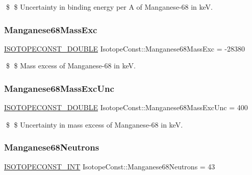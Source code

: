 \$ \$ Uncertainty in binding energy per A of Manganese-\/68 in keV. \mbox{\label{group___isotope_const-_manganese-_mn68_ga90b729dea090cddccef6f1aadea3bc76}} 
\subsubsection{\texorpdfstring{Manganese68\+Mass\+Exc}{Manganese68MassExc}}
{\footnotesize\ttfamily \mbox{\hyperlink{group___isotope_const-_macros_ga8f45a7272ce02c0b4c65c44636ed719a}{I\+S\+O\+T\+O\+P\+E\+C\+O\+N\+S\+T\+\_\+\+D\+O\+U\+B\+LE}} Isotope\+Const\+::\+Manganese68\+Mass\+Exc = -\/28380}

\$ \$ Mass excess of Manganese-\/68 in keV. \mbox{\label{group___isotope_const-_manganese-_mn68_ga2876be132f474e4c2b820f9cf561535a}} 
\subsubsection{\texorpdfstring{Manganese68\+Mass\+Exc\+Unc}{Manganese68MassExcUnc}}
{\footnotesize\ttfamily \mbox{\hyperlink{group___isotope_const-_macros_ga8f45a7272ce02c0b4c65c44636ed719a}{I\+S\+O\+T\+O\+P\+E\+C\+O\+N\+S\+T\+\_\+\+D\+O\+U\+B\+LE}} Isotope\+Const\+::\+Manganese68\+Mass\+Exc\+Unc = 400}

\$ \$ Uncertainty in mass excess of Manganese-\/68 in keV. \mbox{\label{group___isotope_const-_manganese-_mn68_gac682d9d89e76d4c5aa4506ad8f4ae13f}} 
\subsubsection{\texorpdfstring{Manganese68\+Neutrons}{Manganese68Neutrons}}
{\footnotesize\ttfamily \mbox{\hyperlink{group___isotope_const-_macros_ga5f18360b3e99483a35c32d789e62621c}{I\+S\+O\+T\+O\+P\+E\+C\+O\+N\+S\+T\+\_\+\+I\+NT}} Isotope\+Const\+::\+Manganese68\+Neutrons = 43}


